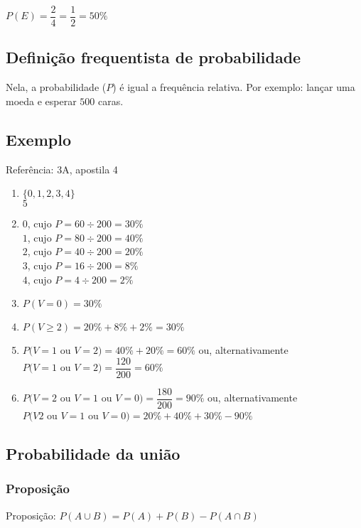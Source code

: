 \documentclass[a4paper]{article}
\begin{document}
	$P(E) = \dfrac{2}{4} = \dfrac{1}{2} = 50\%$
	
	\subsection{Definição frequentista de probabilidade}
	
	Nela, a probabilidade ($P$) é igual a frequência relativa. Por exemplo: lançar uma moeda e esperar $500$ caras.
	
	\subsection{Exemplo}
	
	\noindent Referência: 3A, apostila 4
	
	\begin{enumerate}[label=\alph*.]
		\item $\{0,1,2,3,4\}$ \\ $5$
		\item $0$, cujo $P = 60 \div 200 = 30\%$ \\
			$1$, cujo $P = 80 \div 200 = 40\%$ \\ 
			$2$, cujo $P = 40 \div 200 = 20\%$ \\
			$3$, cujo $P = 16 \div 200 = 8\%$ \\
			$4$, cujo $P = 4 \div 200 = 2\%$
		\item $P(V=0) = 30\%$
		\item $P(V \geq 2) = 20\% + 8\% + 2\% = 30\%$
		\item $P(V=1$ ou $V=2) = 40\% + 20\% = 60\%$ ou, alternativamente \\
			$P(V=1$ ou $V=2) = \dfrac{120}{200} = 60\%$
		\item $P(V=2$ ou $V=1$ ou $V=0) = \dfrac{180}{200} = 90\%$ ou, alternativamente \\
			$P(V2$ ou $V=1$ ou $V=0) = 20\% + 40\% + 30\% - 90\%$
	\end{enumerate}
	
	\subsection{Probabilidade da união}
	
	\subsubsection{Proposição}
	
	Proposição: $P(A \cup B) = P(A) + P(B) - P(A \cap B)$
	
\end{document}
